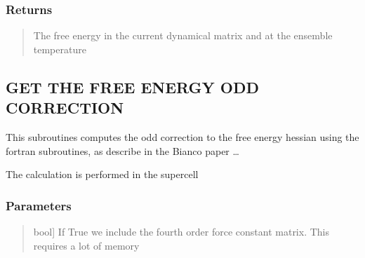 \documentclass[a4paper,11pt,english]{sphinxmanual}
\begin{document}
\begin{fulllineitems}
\begin{fulllineitems}
\begin{quote}
\begin{description}
\end{description}
\end{quote}


\subsubsection{Returns}
\label{\detokenize{apireference:returns}}\begin{quote}
\begin{description}
\sphinxAtStartPar
The free energy in the current dynamical matrix and at the ensemble temperature

\end{description}
\end{quote}

\end{fulllineitems}


\begin{fulllineitems}
\label{\detokenize{apireference:sscha.Ensemble.Ensemble.get_free_energy_hessian}}
\pysigstartsignatures
{}
\pysigstopsignatures

\subsection{GET THE FREE ENERGY ODD CORRECTION}
\label{\detokenize{apireference:get-the-free-energy-odd-correction}}
\sphinxAtStartPar
This subroutines computes the odd correction
to the free energy hessian using the fortran subroutines, as describe in the
Bianco paper …

\sphinxAtStartPar
The calculation is performed in the supercell


\subsubsection{Parameters}
\label{\detokenize{apireference:id8}}\begin{quote}
\begin{description}
\sphinxlineitem{include\_v4}{[}bool{]}
\sphinxAtStartPar
If True we include the fourth order force constant matrix.
This requires a lot of memory


\end{description}
\end{quote}
\end{fulllineitems}
\end{fulllineitems}
\end{document}
